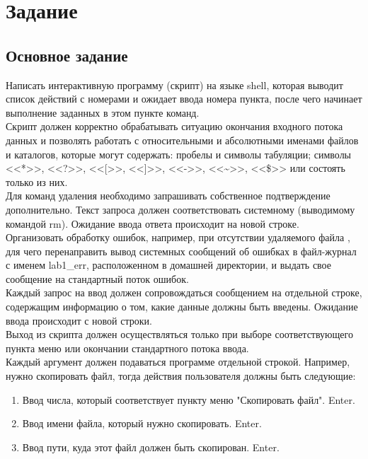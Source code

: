 \section{Задание}
\subsection{Основное задание}
Написать интерактивную программу (скрипт) на языке shell, 
которая выводит список действий с номерами и ожидает ввода номера пункта,
после чего начинает выполнение заданных в этом пункте команд.\\

Скрипт должен корректно обрабатывать ситуацию окончания 
входного потока данных и позволять работать с относительными 
и абсолютными именами файлов и каталогов, которые могут содержать: 
пробелы и символы табуляции; 
символы <<*>>, <<?>>, <<[>>, <<]>>, <<->>, <<\textasciitilde>>, <<\$>> 
или состоять только из них.\\

Для команд удаления необходимо запрашивать собственное 
подтверждение дополнительно. 
Текст запроса должен соответствовать системному 
(выводимому командой rm). 
Ожидание ввода ответа происходит на новой строке.\\

Организовать обработку ошибок, например, при отсутствии удаляемого файла
, для чего перенаправить вывод системных сообщений об ошибках 
в файл-журнал с именем lab1\_err, 
расположенном в домашней директории, 
и выдать свое сообщение на стандартный поток ошибок.\\

Каждый запрос на ввод должен сопровождаться сообщением на 
отдельной строке, содержащим информацию о том, 
какие данные должны быть введены. 
Ожидание ввода происходит с новой строки.\\

Выход из скрипта должен осуществляться только при выборе 
соответствующего пункта меню или окончании стандартного потока ввода.\\

Каждый аргумент должен подаваться программе отдельной строкой. 
Например, нужно скопировать файл, 
тогда действия пользователя должны быть следующие:

\begin{enumerate}
	\item Ввод числа, который соответствует пункту меню "Скопировать файл". Enter.
	\item Ввод имени файла, который нужно скопировать. Enter.
	\item Ввод пути, куда этот файл должен быть скопирован. Enter. 
\end{enumerate} 

